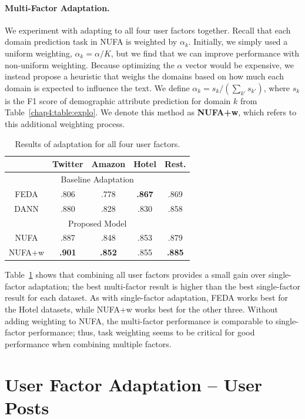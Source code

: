 \paragraph{Multi-Factor Adaptation.} We experiment with adapting to all four user factors together.
Recall that each domain prediction task in NUFA is weighted by $\alpha_k$.
Initially, we simply used a uniform weighting, $\alpha_k = \alpha/K$,
but we find that we can improve performance with non-uniform weighting.
Because optimizing the $\alpha$ vector would be expensive, 
we instead propose a heuristic that weighs the domains
based on how much each domain is expected to influence the text.
We define $\alpha_k = s_k / (\sum_{k'} s_{k'})$, where $s_k$ is the F1 score of demographic attribute prediction for domain $k$ from Table~\ref{chap4:table:explo}.
We denote this method as {\bf NUFA+w}, which refers to this additional weighting process.

\begin{table}[htp]
\centering
\begin{tabular}{c|c|c|c|c}
 & Twitter & Amazon & Hotel & Rest. \\\hline
\multicolumn{5}{c}{Baseline Adaptation} \\\hline
FEDA & .806 & .778 & \bf .867 & .869 \\\hline
DANN & .880 & .828 & .830 & .858 \\\hline
\multicolumn{5}{c}{Proposed Model} \\\hline
NUFA & .887 & .848 & .853 & .879 \\
NUFA+w & \bf .901 & \bf .852 & .855 & \bf .885 \\
\end{tabular}
\caption{Results of adaptation for all four user factors.}
\label{chap4:table:multi}
\end{table}

Table~\ref{chap4:table:multi} shows that combining all user factors
provides a small gain over single-factor adaptation;
the best multi-factor result is higher than the best single-factor result for each dataset.
As with single-factor adaptation, FEDA works best for the Hotel datasets,
while NUFA+w works best for the other three.
Without adding weighting to NUFA, the multi-factor performance is comparable to single-factor performance;
thus, task weighting seems to be critical for good performance when combining multiple factors.


\section{User Factor Adaptation -- User Posts}
\label{chap4:sec:uemb}

